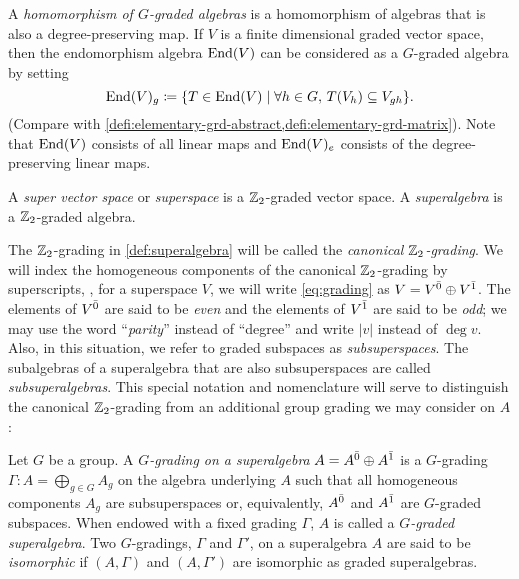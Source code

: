 A \emph{homomorphism of $G$-graded algebras} is a homomorphism of algebras that is also a degree-preserving map. 
If $V$ is a finite dimensional graded vector space, then the endomorphism algebra $\operatorname{End}(V)$ can be considered as a $G$-graded algebra by setting 
\[\label{eq:elementary-1st}
    \operatorname{End}(V)_g \coloneqq \{ T\in \operatorname{End}(V) \mid \forall h\in G,\, T(V_h) \subseteq V_{gh} \}.
\]
(Compare with \cref{defi:elementary-grd-abstract,defi:elementary-grd-matrix}).
Note that $\operatorname{End}(V)$ consists of all linear maps and $\operatorname{End}(V)_e$ consists of the degree-preserving linear maps.





\begin{defi}\label{def:superalgebra}
    A \emph{super vector space} or \emph{superspace} is a $\mathbb{Z}_2$-graded vector space. 
    A \emph{superalgebra} is a $\mathbb{Z}_2$-graded algebra. 
\end{defi}

The $\mathbb{Z}_2$-grading in \cref{def:superalgebra} will be called the \emph{canonical $\mathbb{Z}_2$-grading}.
We will index the homogeneous components of the canonical $\mathbb{Z}_2$-grading by superscripts, \ie, for a superspace $V$, we will write \cref{eq:grading} as $V = V^{\bar0} \oplus V^{\bar1}$. 
The elements of $V^{\bar0}$ are said to be \emph{even} and the elements of $V^{\bar1}$ are said to be \emph{odd}; we may use the word ``\emph{parity}'' instead of ``degree'' and write $|v|$ instead of $\deg v$. 
Also, in this situation, we refer to graded subspaces as \emph{subsuperspaces}. 
The subalgebras of a superalgebra that are also subsuperspaces are called \emph{subsuperalgebras}. 
This special notation and nomenclature will serve to distinguish the canonical $\mathbb{Z}_2$-grading from an additional group grading we may consider on $A$:  

\begin{defi}\label{defi:grd-sa}
    Let $G$ be a group. 
    A \emph{$G$-grading on a superalgebra} $A = A^{\bar0} \oplus A^{\bar1}$ is a $G$-grading $\Gamma: A = \bigoplus_{g\in G} A_g$ on the algebra underlying $A$ such that all homogeneous components $A_g$ are subsuperspaces or, equivalently, $A^{\bar0}$ and $A^{\bar1}$ are $G$-graded subspaces. 
    When endowed with a fixed grading $\Gamma$, $A$ is called a \emph{$G$-graded superalgebra}. 
    Two $G$-gradings, $\Gamma$ and $\Gamma'$, on a superalgebra $A$ are said to be \emph{isomorphic} if $(A, \Gamma)$ and $(A, \Gamma')$ are isomorphic as graded superalgebras. 
\end{defi}


